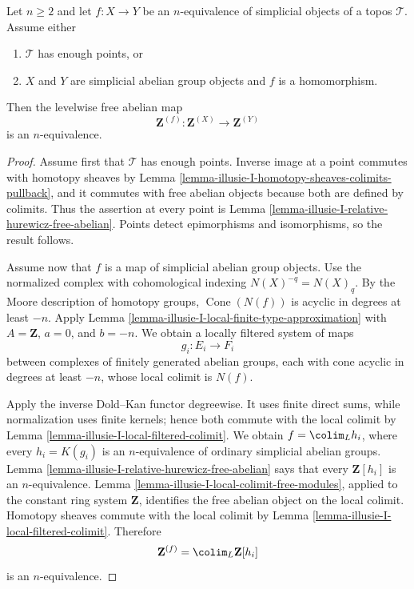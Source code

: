 \begin{theorem}
\label{theorem-illusie-I-free-abelian-n-equivalence}
Let $n \geq 2$ and let $f : X \to Y$ be an $n$-equivalence of simplicial
objects of a topos $\mathcal{T}$. Assume either
\begin{enumerate}
\item $\mathcal{T}$ has enough points, or
\item $X$ and $Y$ are simplicial abelian group objects and $f$ is a
homomorphism.
\end{enumerate}
Then the levelwise free abelian map
$$
\mathbf{Z}^{(f)} : \mathbf{Z}^{(X)} \longrightarrow \mathbf{Z}^{(Y)}
$$
is an $n$-equivalence.
\end{theorem}

\begin{proof}
Assume first that $\mathcal{T}$ has enough points. Inverse image at a point
commutes with homotopy sheaves by Lemma
\ref{lemma-illusie-I-homotopy-sheaves-colimits-pullback}, and it commutes
with free abelian objects because both are defined by colimits. Thus the
assertion at every point is Lemma
\ref{lemma-illusie-I-relative-hurewicz-free-abelian}. Points detect
epimorphisms and isomorphisms, so the result follows.

Assume now that $f$ is a map of simplicial abelian group objects. Use the
normalized complex with cohomological indexing
$N(X)^{-q} = N(X)_q$. By the Moore description of homotopy groups,
$\operatorname{Cone}(N(f))$ is acyclic in degrees at least $-n$.
Apply Lemma \ref{lemma-illusie-I-local-finite-type-approximation} with
$A = \mathbf{Z}$, $a = 0$, and $b = -n$. We obtain a locally filtered
system of maps
$$
g_i : E_i \longrightarrow F_i
$$
between complexes of finitely generated abelian groups, each with cone
acyclic in degrees at least $-n$, whose local colimit is $N(f)$.

Apply the inverse Dold--Kan functor degreewise. It uses finite direct sums,
while normalization uses finite kernels; hence both commute with the local
colimit by Lemma \ref{lemma-illusie-I-local-filtered-colimit}. We obtain
$f = \colim_L h_i$, where every $h_i = K(g_i)$ is an $n$-equivalence of
ordinary simplicial abelian groups. Lemma
\ref{lemma-illusie-I-relative-hurewicz-free-abelian} says that every
$\mathbf{Z}[h_i]$ is an $n$-equivalence. Lemma
\ref{lemma-illusie-I-local-colimit-free-modules}, applied to the constant
ring system $\mathbf{Z}$, identifies the free abelian object on the local
colimit. Homotopy sheaves commute with the local colimit by Lemma
\ref{lemma-illusie-I-local-filtered-colimit}. Therefore
$$
\mathbf{Z}^{(f)} = \colim_L \mathbf{Z}[h_i]
$$
is an $n$-equivalence.
\end{proof}

